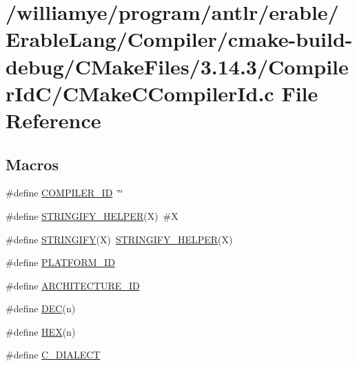 \hypertarget{_compiler_2cmake-build-debug_2_c_make_files_23_814_83_2_compiler_id_c_2_c_make_c_compiler_id_8c}{}\section{/williamye/program/antlr/erable/\+Erable\+Lang/\+Compiler/cmake-\/build-\/debug/\+C\+Make\+Files/3.14.3/\+Compiler\+Id\+C/\+C\+Make\+C\+Compiler\+Id.c File Reference}
\label{_compiler_2cmake-build-debug_2_c_make_files_23_814_83_2_compiler_id_c_2_c_make_c_compiler_id_8c}
\subsection*{Macros}
\begin{DoxyCompactItemize}
\item 
\#define \mbox{\hyperlink{_compiler_2cmake-build-debug_2_c_make_files_23_814_83_2_compiler_id_c_2_c_make_c_compiler_id_8c_a81dee0709ded976b2e0319239f72d174}{C\+O\+M\+P\+I\+L\+E\+R\+\_\+\+ID}}~\char`\"{}\char`\"{}
\item 
\#define \mbox{\hyperlink{_compiler_2cmake-build-debug_2_c_make_files_23_814_83_2_compiler_id_c_2_c_make_c_compiler_id_8c_a2ae9b72bb13abaabfcf2ee0ba7d3fa1d}{S\+T\+R\+I\+N\+G\+I\+F\+Y\+\_\+\+H\+E\+L\+P\+ER}}(X)~\#X
\item 
\#define \mbox{\hyperlink{_compiler_2cmake-build-debug_2_c_make_files_23_814_83_2_compiler_id_c_2_c_make_c_compiler_id_8c_a43e1cad902b6477bec893cb6430bd6c8}{S\+T\+R\+I\+N\+G\+I\+FY}}(X)~\mbox{\hyperlink{_v_m_2cmake-build-debug_2_c_make_files_23_814_83_2_compiler_id_c_x_x_2_c_make_c_x_x_compiler_id_8cpp_a2ae9b72bb13abaabfcf2ee0ba7d3fa1d}{S\+T\+R\+I\+N\+G\+I\+F\+Y\+\_\+\+H\+E\+L\+P\+ER}}(X)
\item 
\#define \mbox{\hyperlink{_compiler_2cmake-build-debug_2_c_make_files_23_814_83_2_compiler_id_c_2_c_make_c_compiler_id_8c_adbc5372f40838899018fadbc89bd588b}{P\+L\+A\+T\+F\+O\+R\+M\+\_\+\+ID}}
\item 
\#define \mbox{\hyperlink{_compiler_2cmake-build-debug_2_c_make_files_23_814_83_2_compiler_id_c_2_c_make_c_compiler_id_8c_aba35d0d200deaeb06aee95ca297acb28}{A\+R\+C\+H\+I\+T\+E\+C\+T\+U\+R\+E\+\_\+\+ID}}
\item 
\#define \mbox{\hyperlink{_compiler_2cmake-build-debug_2_c_make_files_23_814_83_2_compiler_id_c_2_c_make_c_compiler_id_8c_ad1280362da42492bbc11aa78cbf776ad}{D\+EC}}(n)
\item 
\#define \mbox{\hyperlink{_compiler_2cmake-build-debug_2_c_make_files_23_814_83_2_compiler_id_c_2_c_make_c_compiler_id_8c_a46d5d95daa1bef867bd0179594310ed5}{H\+EX}}(n)
\item 
\#define \mbox{\hyperlink{_compiler_2cmake-build-debug_2_c_make_files_23_814_83_2_compiler_id_c_2_c_make_c_compiler_id_8c_a07f8e5783674099cd7f5110e22a78cdb}{C\+\_\+\+D\+I\+A\+L\+E\+CT}}
\end{DoxyCompactItemize}
